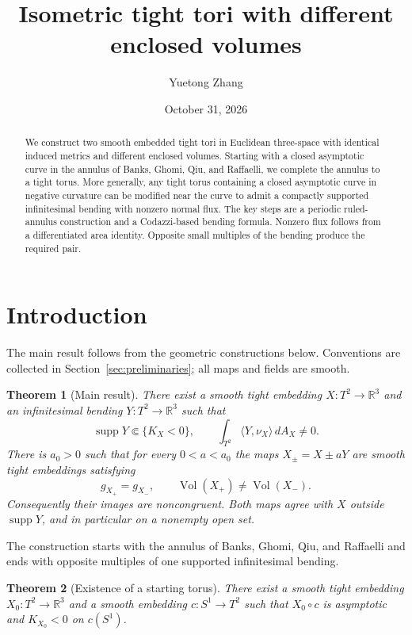 \documentclass[11pt]{amsart}
\title{Isometric tight tori with different enclosed volumes}
\author{Yuetong Zhang}
\date{October 31, 2026}
\newtheorem{theorem}{Theorem}[section]
\theoremstyle{definition}
\newcommand{\R}{\mathbb R}
\DeclareMathOperator{\supp}{supp}
\DeclareMathOperator{\Vol}{Vol}
\begin{document}
\begin{abstract}
We construct two smooth embedded tight tori in Euclidean three-space
with identical induced metrics and different enclosed volumes.
Starting with a closed asymptotic curve in the annulus of Banks,
Ghomi, Qiu, and Raffaelli, we complete the annulus to a tight torus.
More generally, any tight torus containing a closed asymptotic curve
in negative curvature can be modified near the curve to admit a
compactly supported infinitesimal bending with nonzero normal flux.
The key steps are a periodic ruled-annulus construction and a
Codazzi-based bending formula. Nonzero flux follows from a
differentiated area identity. Opposite small multiples of the
bending produce the required pair.
\end{abstract}
\maketitle

\section{Introduction}

The main result follows from the geometric constructions below.
Conventions are collected in Section~\ref{sec:preliminaries};
all maps and fields are smooth.

\begin{theorem}[Main result]\label{thm:main}
There exist a smooth tight embedding $X:T^2\to\R^3$ and an
infinitesimal bending $Y:T^2\to\R^3$ such that
\[
 \supp Y\Subset\{K_X<0\},
 \qquad \int_{T^2}\langle Y,\nu_X\rangle\,dA_X\ne0.
\]
There is $a_0>0$ such that for every $0<a<a_0$ the maps
$X_\pm=X\pm aY$ are smooth tight embeddings satisfying
\begin{equation}\label{eq:main-pair}
 g_{X_+}=g_{X_-},\qquad \Vol(X_+)\ne\Vol(X_-).
\end{equation}
Consequently their images are noncongruent. Both maps agree with $X$
outside $\supp Y$, and in particular on a nonempty open set.
\end{theorem}

The construction starts with the annulus of Banks, Ghomi, Qiu, and
Raffaelli and ends with opposite multiples of one supported
infinitesimal bending.

\begin{theorem}[Existence of a starting torus]\label{thm:seed}
There exist a smooth tight embedding $X_0:T^2\to\R^3$ and a smooth
embedding $c:S^1\to T^2$ such that $X_0\circ c$ is asymptotic and
$K_{X_0}<0$ on $c(S^1)$.
\end{theorem}
\end{document}
